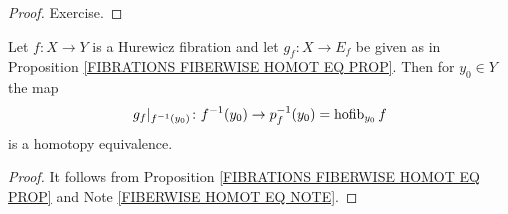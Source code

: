 \begin{proof}
Exercise.
\end{proof}

\begin{corollary}
\label{FIBER VS HOFIBER COROLLARY}
Let $f\colon X \to Y$ is a Hurewicz fibration and let $g_{f}\colon X \to E_{f}$ 
be given as in Proposition \ref{FIBRATIONS FIBERWISE HOMOT EQ PROP}. 
Then for $y_{0}\in Y$ the map 
\[
g_{f}|_{f^{-1}(y_{0})}\colon f^{-1}(y_{0}) \to p_{f}^{-1}(y_{0}) = \operatorname{hofib}_{y_{0}}f
\]
is a homotopy equivalence.
\end{corollary}

\begin{proof}
It follows from Proposition \ref{FIBRATIONS FIBERWISE HOMOT EQ PROP}
and Note \ref{FIBERWISE HOMOT EQ NOTE}. 
\end{proof}





